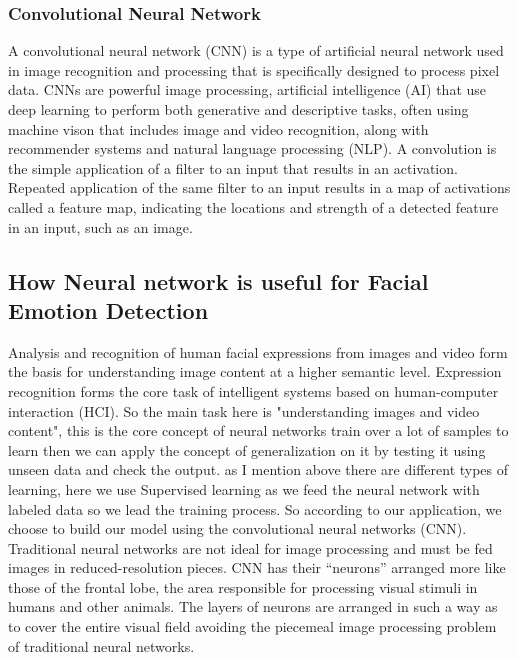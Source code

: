 \subsubsection{Convolutional Neural Network}
A convolutional neural network (CNN) is a type of artificial neural network used in image recognition and processing that is specifically designed to process pixel data.
\newline
CNNs are powerful image processing, artificial intelligence (AI) that use deep learning to perform both generative and descriptive tasks, often using machine vison that includes image and video recognition, along with recommender systems and natural language processing (NLP).
\newline
A convolution is the simple application of a filter to an input that results in an activation. Repeated application of the same filter to an input results in a map of activations called a feature map, indicating the locations and strength of a detected feature in an input, such as an image.

\subsection{How Neural network is  useful for Facial Emotion Detection}
Analysis and recognition of human facial expressions
from images and video form the basis for understanding
image content at a higher semantic level. Expression
recognition forms the core task of intelligent systems
based on human-computer interaction (HCI). So the main task here is "understanding images and video content", this is the core concept of neural networks train over a lot of samples to learn then we can apply the concept of generalization on it by testing it using unseen data and check the output. 
as I mention above  there are different types of learning, here we  use Supervised learning as we feed the neural network with labeled data so we lead the training process.
\newline
So according to our application, we choose to build our model using the convolutional neural networks (CNN).
\newline
Traditional neural networks are not ideal for image processing and must be fed images in reduced-resolution pieces. CNN has their “neurons” arranged more like those of the frontal lobe, the area responsible for processing visual stimuli in humans and other animals. The layers of neurons are arranged in such a way as to cover the entire visual field avoiding the piecemeal image processing problem of traditional neural networks.

